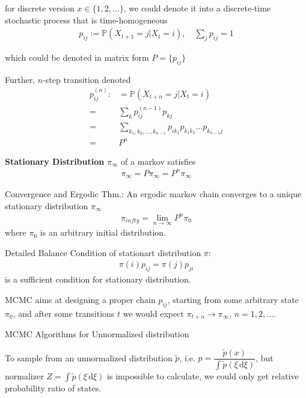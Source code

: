     for discrete version $ x\in\{1,2,\ldots\} $, we could denote it into a discrete-time stochastic process that is time-homogeneous
    \begin{align}
        p_{ij}:= \mathbb{P}\left( X_{t+1}=j|X_{t}=i \right)  ,\quad \sum_{j}p_{ij}=1
    \end{align}

    which could be denoted in matrix form $ P=\{p_{ij}\} $
    
    Further, $ n $-step transition denoted
    \begin{align}
        p^{(n)}_{ij}:&=\mathbb{P}\left( X_{t+n}=j|X_t=i \right) \\
        =&\sum_{k}p^{(n-1)}_{ij}p_{kj}\\
        =&\sum_{k_1,k_2,\ldots ,k_{n-1}}p_{ik_1}p_{k_1k_2}\ldots p_{k_{n-1}j}\\
        =&P^n
    \end{align}

    \textbf{Stationary Distribution} $ \pi_\infty $ of a markov satisfies
    \begin{align}
         \pi_\infty=P\pi_\infty=P^n\pi_{\infty}
    \end{align}
    
    Convergence and Ergodic Thm.: An ergodic markov chain converges to a unique stationary distribution $ \pi_\infty $
    \begin{align}
        \pi_{infty}=\lim_{n\to\infty}P^n\pi_0 
    \end{align}
    where $ \pi_0 $ is an arbitrary initial distribution.
    
    Detailed Balance Condition of stationart distribution $ \pi $:
    \begin{align}
        \pi(i)p_{ij}=\pi(j)p_{ji} 
    \end{align}
    is a sufficient condition for stationary distribution.
    
    MCMC aims at designing a proper chain $ p_{ij} $, starting from some arbitrary state $ \pi_0 $, and after some transitions $ t $ we would expect $ \pi_{t+n}\to \pi_\infty,\,n=1,2,\ldots  $.
    

    
\begin{point}
    MCMC Algorithms for Unnormalized distribution
\end{point}

    To sample from an unnormalized distribution $ \tilde{p} $, i.e. $ p=\dfrac{\tilde{p}(x)}{\int \tilde{p}(\xi \,\mathrm{d}\xi)} $, but normalizer $ Z=\int \tilde{p}(\xi \,\mathrm{d}\xi) $ is impossible to calculate, we could only get relative probability ratio of states.



